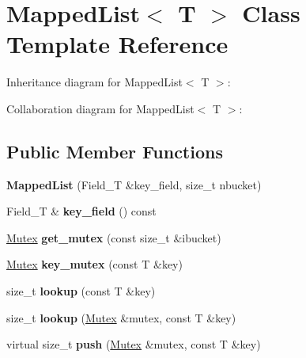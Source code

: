 \hypertarget{classMappedList}{}\section{Mapped\+List$<$ T $>$ Class Template Reference}
\label{classMappedList}


Inheritance diagram for Mapped\+List$<$ T $>$\+:


Collaboration diagram for Mapped\+List$<$ T $>$\+:
\subsection*{Public Member Functions}
\begin{DoxyCompactItemize}
\item 
{\bfseries Mapped\+List} (Field\+\_\+T \&key\+\_\+field, size\+\_\+t nbucket)\hypertarget{classMappedList_a44b41bb6e529b41ffcefbe56eb4adfd1}{}\label{classMappedList_a44b41bb6e529b41ffcefbe56eb4adfd1}

\item 
Field\+\_\+T \& {\bfseries key\+\_\+field} () const \hypertarget{classMappedList_aa46baabdba480df9a86acdcd18b1188c}{}\label{classMappedList_aa46baabdba480df9a86acdcd18b1188c}

\item 
\hyperlink{classMutex}{Mutex} {\bfseries get\+\_\+mutex} (const size\+\_\+t \&ibucket)\hypertarget{classMappedList_adb79b255ef483be6db0e5b1df8b67427}{}\label{classMappedList_adb79b255ef483be6db0e5b1df8b67427}

\item 
\hyperlink{classMutex}{Mutex} {\bfseries key\+\_\+mutex} (const T \&key)\hypertarget{classMappedList_ac71caaf3d9ef84b2a8ebe74aceb521e3}{}\label{classMappedList_ac71caaf3d9ef84b2a8ebe74aceb521e3}

\item 
size\+\_\+t {\bfseries lookup} (const T \&key)\hypertarget{classMappedList_a4012839b741959be24806c84822771ee}{}\label{classMappedList_a4012839b741959be24806c84822771ee}

\item 
size\+\_\+t {\bfseries lookup} (\hyperlink{classMutex}{Mutex} \&mutex, const T \&key)\hypertarget{classMappedList_ab27b585e903b60f7fbe0c0645a4f3f93}{}\label{classMappedList_ab27b585e903b60f7fbe0c0645a4f3f93}

\item 
virtual size\+\_\+t {\bfseries push} (\hyperlink{classMutex}{Mutex} \&mutex, const T \&key)\hypertarget{classMappedList_aedad74b21e53866cbfaace5118e4e280}{}\label{classMappedList_aedad74b21e53866cbfaace5118e4e280}


\end{DoxyCompactItemize}

